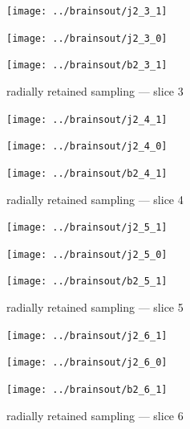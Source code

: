 \documentclass{article}
\begin{document}
\begin{figure}
\begin{centering}

\parbox{\imsize}{\texttt{[image: ../brainsout/j2\_3\_1]}}

\vspace{\vertsep}

\parbox{\imsize}{\texttt{[image: ../brainsout/j2\_3\_0]}}

\vspace{\vertsep}

\parbox{\imsize}{\texttt{[image: ../brainsout/b2\_3\_1]}}

\end{centering}
\caption{radially retained sampling --- slice 3}
\end{figure}


\begin{figure}
\begin{centering}

\parbox{\imsize}{\texttt{[image: ../brainsout/j2\_4\_1]}}

\vspace{\vertsep}

\parbox{\imsize}{\texttt{[image: ../brainsout/j2\_4\_0]}}

\vspace{\vertsep}

\parbox{\imsize}{\texttt{[image: ../brainsout/b2\_4\_1]}}

\end{centering}
\caption{radially retained sampling --- slice 4}
\end{figure}


\begin{figure}
\begin{centering}

\parbox{\imsize}{\texttt{[image: ../brainsout/j2\_5\_1]}}

\vspace{\vertsep}

\parbox{\imsize}{\texttt{[image: ../brainsout/j2\_5\_0]}}

\vspace{\vertsep}

\parbox{\imsize}{\texttt{[image: ../brainsout/b2\_5\_1]}}

\end{centering}
\caption{radially retained sampling --- slice 5}
\end{figure}


\begin{figure}
\begin{centering}

\parbox{\imsize}{\texttt{[image: ../brainsout/j2\_6\_1]}}

\vspace{\vertsep}

\parbox{\imsize}{\texttt{[image: ../brainsout/j2\_6\_0]}}

\vspace{\vertsep}

\parbox{\imsize}{\texttt{[image: ../brainsout/b2\_6\_1]}}

\end{centering}
\caption{radially retained sampling --- slice 6}
\end{figure}
\end{document}
